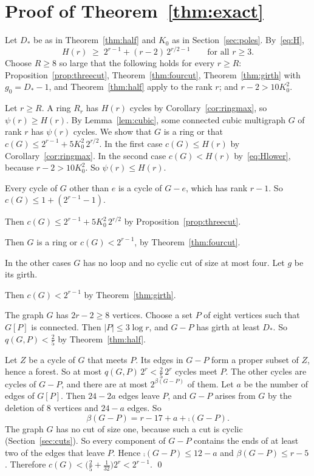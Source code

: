 \section{Proof of Theorem~\ref{thm:exact}}\label{sec:proof}

Let $D_*$ be as in Theorem~\ref{thm:half} and $K_0$ as in Section~\ref{sec:poles}.
By~\eqref{eq:H},
\begin{equation}\label{eq:Hlower}
  H(r)\;\ge\;2^{r-1}+(r-2)\,2^{r/2-1}\qquad\text{for all }r\ge3 .
\end{equation}
Choose $R\ge8$ so large that the following holds for every $r\ge R$:
Proposition~\ref{prop:threecut}, Theorem~\ref{thm:fourcut}, Theorem~\ref{thm:girth} with
$g_0=D_*-1$, and Theorem~\ref{thm:half} apply to the rank $r$; and $r-2>10K_0^{2}$.

Let $r\ge R$. A ring $R_r$ has $H(r)$ cycles by Corollary~\ref{cor:ringmax}, so $\psi(r)\ge H(r)$.
By Lemma~\ref{lem:cubic}, some connected cubic multigraph $G$ of rank $r$ has $\psi(r)$ cycles. We
show that $G$ is a ring or that $c(G)\le2^{r-1}+5K_0^{2}\,2^{r/2}$. In the first case
$c(G)\le H(r)$ by Corollary~\ref{cor:ringmax}. In the second case $c(G)<H(r)$ by~\eqref{eq:Hlower},
because $r-2>10K_0^{2}$. So $\psi(r)\le H(r)$.

 Every cycle of $G$ other than $e$ is a cycle of $G-e$, which has
rank $r-1$. So $c(G)\le1+(2^{r-1}-1)$.

 Then
$c(G)\le2^{r-1}+5K_0^{2}\,2^{r/2}$ by Proposition~\ref{prop:threecut}.

 Then $G$ is a ring or $c(G)<2^{r-1}$, by Theorem~\ref{thm:fourcut}.

In the other cases $G$ has no loop and no cyclic cut of size at most four. Let $g$ be its girth.

 Then $c(G)<2^{r-1}$ by Theorem~\ref{thm:girth}.

 The graph $G$ has $2r-2\ge8$ vertices. Choose a set $P$ of eight
vertices such that $G[P]$ is connected. Then $|P|\le3\log r$, and $G-P$ has girth at least $D_*$.
So $q(G,P)<\frac25$ by Theorem~\ref{thm:half}.

Let $Z$ be a cycle of $G$ that meets $P$. Its edges in $G-P$ form a proper subset of $Z$, hence a
forest. So at most $q(G,P)\,2^{r}<\frac25\,2^{r}$ cycles meet $P$. The other cycles are cycles of
$G-P$, and there are at most $2^{\beta(G-P)}$ of them. Let $a$ be the number of edges of $G[P]$.
Then $24-2a$ edges leave $P$, and $G-P$ arises from $G$ by the deletion of $8$ vertices and
$24-a$ edges. So
\[
  \beta(G-P)=r-17+a+\comp(G-P).
\]
The graph $G$ has no cut of size one, because such a cut is cyclic (Section~\ref{sec:cuts}). So
every component of $G-P$ contains the ends of at least two of the edges that leave $P$. Hence
$\comp(G-P)\le12-a$ and $\beta(G-P)\le r-5$. Therefore
$c(G)<\bigl(\frac25+\frac1{32}\bigr)2^{r}<2^{r-1}$. \qed
